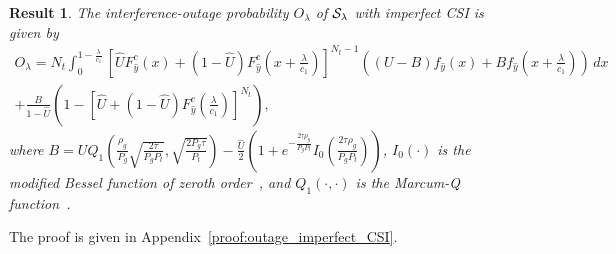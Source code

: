 \documentclass[12pt,draftcls,peerreview,onecolumn]{IEEEtran}
\newtheorem{result}{{\bf Result}}
\newcommand{\lam}{\lambda}
\newcommand{\Nt}{{N_t}}
\newcommand{\Nr}{{N_r}}
\newcommand{\Pt}{{P_t}}
\newcommand{\itau}{\tau}
\newcommand{\cone}{c_{1}}
\newcommand{\ctwo}{c_{2}}
\newcommand{\out}{O}
\newcommand{\lambym}{\frac{\lam}{\cone}}
\newcommand{\al}{\ctwo}
\newcommand{\snr}{\Omega}
\newcommand{\un}{U}
\newcommand{\callamrule}{{\cal S_{{\lam}}}}
\newcommand{\outlam}{\out_{\lam}}
\newcommand{\unhat}{\widehat{\un}}
\newcommand{\snrhat}{\widehat{\snr}}
\newcommand{\gpilotpower}{P_g}
\newcommand{\yhat}{\hat{y}}
\newcommand{\Probglt}{B}
\newcommand{\albysnrhat}[1][]{\frac{\al#1}{\snrhat}}
\newcommand{\rhog}{\rho_g}
\begin{document}
\begin{result}
\label{thm:outage_imperfect_CSI}
  The interference-outage probability $\outlam$ of $\callamrule$ with imperfect CSI is given by
\begin{multline}
\label{eq:pr_outage_impefect} 
\!\outlam \!=\! \Nt \!\int_{0}^{1-\lambym} 	
\!\left[ \unhat F_{\yhat}^{c}\left(x\right) + \left(1 -\unhat\right)F_{\yhat}^{c}\left(x+\lambym\right)\right]^{\Nt-1}\!\! \left(\! (\un - \Probglt) f_{\yhat}\left(x\right)  \!+\!  \Probglt f_{\yhat}\!\left(\! x+\lambym\right) \!\right)\, dx\\
+ \frac{ \Probglt}{1 - \unhat} \left( 1 - \left[\unhat + \left(1 -\unhat\right)F_{\yhat}^{c}\left(\lambym\right)  \right]^{\Nt}  \right),
\end{multline}
%
%
where  $\Probglt \!=\! \un  Q_1\!\left(\frac{\rhog}{ \gpilotpower} \sqrt{\frac{2\itau}{ \gpilotpower\Pt}},\sqrt{\frac{2 \gpilotpower\itau}{\Pt}}\right) \! - \frac{\unhat}{2} \left(\! 1 + e^{-\frac{2\itau\rhog}{ \gpilotpower\Pt}}I_{0}\!\left(\frac{2\itau\rhog}{ \gpilotpower\Pt} \right) \!\right)$, $I_{0}(\cdot)$ is the modified Bessel function of zeroth order~\cite[(8.406.3)]{gradshteyn00_book}, and  $Q_1(\cdot,\cdot)$ is the Marcum-Q function~\cite[(4.34)]{simon_alouini_book}.  %
\end{result}
%
\begin{IEEEproof}
	The proof is given in Appendix~\ref{proof:outage_imperfect_CSI}.
\end{IEEEproof}
%
\end{document}
